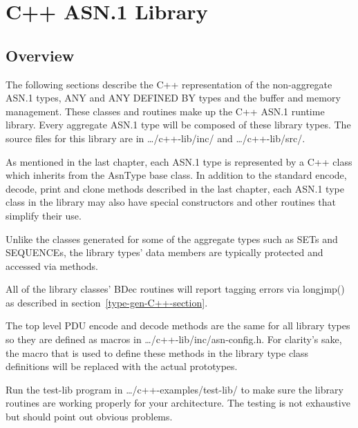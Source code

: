
%
%

\chapter{\label{lib-C++-chapter}C++ ASN.1 Library}
\section{\label{libover-C++-section}Overview}

The following sections describe the C++ representation of the
non-aggregate ASN.1 types, ANY and ANY DEFINED BY types and
the buffer and memory management.  These classes and routines make
up the C++ ASN.1 runtime library. Every aggregate ASN.1 type will be
composed of these library types. The source files for this library
are in {\ufn \dots/c++-lib/inc/} and {\ufn \dots/c++-lib/src/}.

As mentioned in the last chapter, each ASN.1 type is represented by a
C++ class which inherits from the {\C AsnType} base class.  In
addition to the standard encode, decode, print and clone methods
described in the last chapter, each ASN.1 type class in the library
may also have special constructors and other routines that simplify
their use.

Unlike the classes generated for some of the aggregate types such as
SETs and SEQUENCEs, the library types' data members are typically
protected and accessed via methods.

All of the library classes' {\C BDec} routines will report tagging errors
via {\C longjmp()} as described in section~\ref{type-gen-C++-section}.

The top level PDU encode and decode methods are the same for all
library types so they are defined as macros in
{\ufn \dots/c++-lib/inc/asn-config.h}. For clarity's sake, the macro
that is used to define these methods in the library type class
definitions will be replaced with the actual prototypes.

Run the {\ufn test-lib} program in {\ufn \dots/c++-examples/test-lib/}
to make sure the library routines are working properly for your
architecture.  The testing is not exhaustive but should point out
obvious problems.


